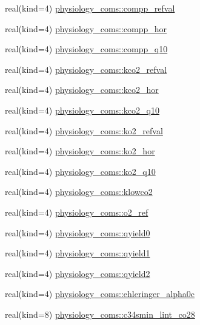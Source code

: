 \begin{DoxyCompactItemize}
real(kind=4) \hyperlink{namespacephysiology__coms_a040ae8708ee3f595e037d5ecd862b9cb}{physiology\+\_\+coms\+::compp\+\_\+refval}
\item 
real(kind=4) \hyperlink{namespacephysiology__coms_a95a3966dda3b047ea282410207b0fd19}{physiology\+\_\+coms\+::compp\+\_\+hor}
\item 
real(kind=4) \hyperlink{namespacephysiology__coms_aae7373d82d49b0ce76e9a3261df920ea}{physiology\+\_\+coms\+::compp\+\_\+q10}
\item 
real(kind=4) \hyperlink{namespacephysiology__coms_ae8c6d3c5ceb1841e173110fb665913f3}{physiology\+\_\+coms\+::kco2\+\_\+refval}
\item 
real(kind=4) \hyperlink{namespacephysiology__coms_ab83efab85c46032bd663e0c7432b289a}{physiology\+\_\+coms\+::kco2\+\_\+hor}
\item 
real(kind=4) \hyperlink{namespacephysiology__coms_ac829c2e631b34d9949024fb1bdf3bcb9}{physiology\+\_\+coms\+::kco2\+\_\+q10}
\item 
real(kind=4) \hyperlink{namespacephysiology__coms_a373b2932120fa360997d160b021af1f5}{physiology\+\_\+coms\+::ko2\+\_\+refval}
\item 
real(kind=4) \hyperlink{namespacephysiology__coms_a108de5f1d1e5553e2bb64cb194edb76a}{physiology\+\_\+coms\+::ko2\+\_\+hor}
\item 
real(kind=4) \hyperlink{namespacephysiology__coms_a76dd69909f43d9ff11fab25a03dc5492}{physiology\+\_\+coms\+::ko2\+\_\+q10}
\item 
real(kind=4) \hyperlink{namespacephysiology__coms_abd19969f43ab2ed5e943e0f26da846cd}{physiology\+\_\+coms\+::klowco2}
\item 
real(kind=4) \hyperlink{namespacephysiology__coms_a9d23c454c914eb013dcb434bc476a11f}{physiology\+\_\+coms\+::o2\+\_\+ref}
\item 
real(kind=4) \hyperlink{namespacephysiology__coms_ab7e24ce5122fda9b17878fb18470092a}{physiology\+\_\+coms\+::qyield0}
\item 
real(kind=4) \hyperlink{namespacephysiology__coms_a47d2f31280dea551cf4c2cd53aff5fc2}{physiology\+\_\+coms\+::qyield1}
\item 
real(kind=4) \hyperlink{namespacephysiology__coms_a5c1b8d75f0dfc7666093dded3d7ea12a}{physiology\+\_\+coms\+::qyield2}
\item 
real(kind=4) \hyperlink{namespacephysiology__coms_a95034e71d1d9e03d7872fbe31293a312}{physiology\+\_\+coms\+::ehleringer\+\_\+alpha0c}
\item 
real(kind=8) \hyperlink{namespacephysiology__coms_a3eacccacc558754ca9fd092a3f19c4f7}{physiology\+\_\+coms\+::c34smin\+\_\+lint\+\_\+co28}

\end{DoxyCompactItemize}
